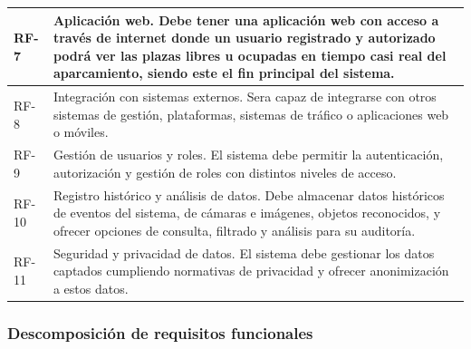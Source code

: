\documentclass[12pt,a4paper]{article}
\begin{document}
\begin{longtable}{p{} p{}}
		\midrule
		RF-7 & Aplicación web. Debe tener una aplicación web con acceso a través de internet donde un usuario registrado y autorizado podrá ver las plazas libres u ocupadas en tiempo casi real del aparcamiento, siendo este el fin principal del sistema. \\
		\midrule
		RF-8 & Integración con sistemas externos. Sera capaz de integrarse con otros sistemas de gestión, plataformas, sistemas de tráfico o aplicaciones web o móviles. \\
		\midrule
		RF-9 & Gestión de usuarios y roles. El sistema debe permitir la autenticación, autorización y gestión de roles con distintos niveles de acceso. \\
		\midrule
		RF-10 & Registro histórico y análisis de datos. Debe almacenar datos históricos de eventos del sistema, de cámaras e imágenes, objetos reconocidos, y ofrecer opciones de consulta, filtrado y análisis para su auditoría. \\
		\midrule
		RF-11 & Seguridad y privacidad de datos. El sistema debe gestionar los datos captados cumpliendo normativas de privacidad y ofrecer anonimización a estos datos. \\
		\bottomrule
	\end{longtable}
	
	\FloatBarrier
	
	\subsubsection{Descomposición de requisitos funcionales}
	
\end{document}
